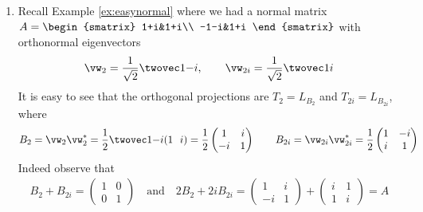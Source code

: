 \begin{examples}
\begin{enumerate}
  \item Recall Example \ref{ex:easynormal} where we had a normal matrix $A=\begin{smatrix}
1+i&1+i\\
-1-i&1+i
\end{smatrix}$
with orthonormal eigenvectors
\[\vw_2=\frac 1{\sqrt 2}\twovec 1{-i},\qquad \vw_{2i}=\frac 1{\sqrt 2}\twovec 1i\]
It is easy to see that the orthogonal projections are $T_2=L_{B_2}$ and $T_{2i}=L_{B_{2i}}$, where
\[B_2=\vw_2\vw_{2}^*=\frac 12\twovec 1{-i}(1\ \ i)=\frac 12\begin{pmatrix}
1&i\\-i&1
\end{pmatrix}
\qquad B_{2i}=\vw_{2i}\vw_{2i}^*=\frac 12\begin{pmatrix}
1&-i\\i&1
\end{pmatrix}\]
Indeed observe that
\begin{gather*}
B_2+B_{2i}=\begin{pmatrix}
1&0\\0&1
\end{pmatrix}\quad\text{and}\quad
2B_2+2iB_{2i}=\begin{pmatrix}
1&i\\-i&1
\end{pmatrix}+\begin{pmatrix}
i&1\\1&i
\end{pmatrix}=A
\end{gather*}


\end{enumerate}
\end{examples}
